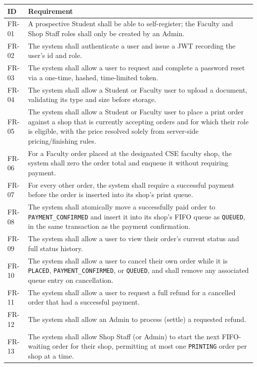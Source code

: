 \documentclass[12pt,a4paper]{report}
\begin{document}
\begin{center}
\renewcommand{\arraystretch}{1.25}
\begin{longtable}{|p{1.4cm}|p{11.9cm}|}
\hline
\textbf{ID} & \textbf{Requirement} \\ \hline
FR-01 & A prospective Student shall be able to self-register; the Faculty and Shop Staff roles shall only be created by an Admin. \\ \hline
FR-02 & The system shall authenticate a user and issue a JWT recording the user's id and role. \\ \hline
FR-03 & The system shall allow a user to request and complete a password reset via a one-time, hashed, time-limited token. \\ \hline
FR-04 & The system shall allow a Student or Faculty user to upload a document, validating its type and size before storage. \\ \hline
FR-05 & The system shall allow a Student or Faculty user to place a print order against a shop that is currently accepting orders and for which their role is eligible, with the price resolved solely from server-side pricing/finishing rules. \\ \hline
FR-06 & For a Faculty order placed at the designated CSE faculty shop, the system shall zero the order total and enqueue it without requiring payment. \\ \hline
FR-07 & For every other order, the system shall require a successful payment before the order is inserted into its shop's print queue. \\ \hline
FR-08 & The system shall atomically move a successfully paid order to \texttt{PAYMENT\_CONFIRMED} and insert it into its shop's FIFO queue as \texttt{QUEUED}, in the same transaction as the payment confirmation. \\ \hline
FR-09 & The system shall allow a user to view their order's current status and full status history. \\ \hline
FR-10 & The system shall allow a user to cancel their own order while it is \texttt{PLACED}, \texttt{PAYMENT\_CONFIRMED}, or \texttt{QUEUED}, and shall remove any associated queue entry on cancellation. \\ \hline
FR-11 & The system shall allow a user to request a full refund for a cancelled order that had a successful payment. \\ \hline
FR-12 & The system shall allow an Admin to process (settle) a requested refund. \\ \hline
FR-13 & The system shall allow Shop Staff (or Admin) to start the next FIFO-waiting order for their shop, permitting at most one \texttt{PRINTING} order per shop at a time. \\ \hline

\end{longtable}
\end{center}
\end{document}
